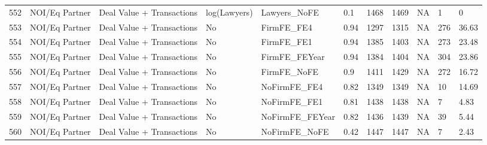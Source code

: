 \begin{table}[ht]
\begin{tabular}{rllllllllll}
  552 & NOI/Eq Partner & Deal Value + Transactions & log(Lawyers) & Lawyers\_NoFE & 0.1 & 1468 & 1469 & NA & 1 & 0 \\ 
  553 & NOI/Eq Partner & Deal Value + Transactions & No & FirmFE\_FE4 & 0.94 & 1297 & 1315 & NA & 276 & 36.63 \\ 
  554 & NOI/Eq Partner & Deal Value + Transactions & No & FirmFE\_FE1 & 0.94 & 1385 & 1403 & NA & 273 & 23.48 \\ 
  555 & NOI/Eq Partner & Deal Value + Transactions & No & FirmFE\_FEYear & 0.94 & 1384 & 1404 & NA & 304 & 23.86 \\ 
  556 & NOI/Eq Partner & Deal Value + Transactions & No & FirmFE\_NoFE & 0.9 & 1411 & 1429 & NA & 272 & 16.72 \\ 
  557 & NOI/Eq Partner & Deal Value + Transactions & No & NoFirmFE\_FE4 & 0.82 & 1349 & 1349 & NA & 10 & 14.69 \\ 
  558 & NOI/Eq Partner & Deal Value + Transactions & No & NoFirmFE\_FE1 & 0.81 & 1438 & 1438 & NA & 7 & 4.83 \\ 
  559 & NOI/Eq Partner & Deal Value + Transactions & No & NoFirmFE\_FEYear & 0.82 & 1436 & 1439 & NA & 39 & 5.44 \\ 
  560 & NOI/Eq Partner & Deal Value + Transactions & No & NoFirmFE\_NoFE & 0.42 & 1447 & 1447 & NA & 7 & 2.43 \\ 
   \hline
\end{tabular}
\end{table}
